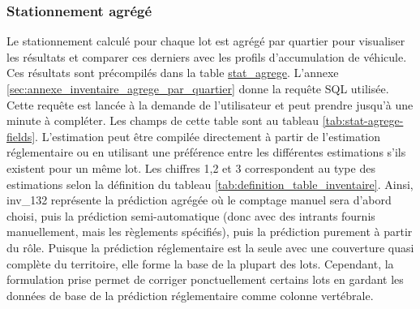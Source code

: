         \subsubsection{Stationnement agrégé}
            Le stationnement calculé pour chaque lot est agrégé par quartier pour visualiser les résultats et comparer ces derniers avec les profils d'accumulation de véhicule. Ces résultats sont précompilés dans la table \ul{stat\_agrege}. L'annexe \ref{sec:annexe_inventaire_agrege_par_quartier} donne la requête SQL utilisée. Cette requête est lancée à la demande de l'utilisateur et peut prendre jusqu'à une minute à compléter. Les champs de cette table sont au tableau \ref{tab:stat-agrege-fields}. L'estimation peut être compilée directement à partir de l'estimation réglementaire ou en utilisant une préférence entre les différentes estimations s'ils existent pour un même lot. Les chiffres 1,2 et 3 correspondent au type des estimations selon la définition du tableau \ref{tab:definition_table_inventaire}. Ainsi, inv\_132 représente la prédiction agrégée où le comptage manuel sera d'abord choisi, puis la prédiction semi-automatique (donc avec des intrants fournis manuellement, mais les règlements spécifiés), puis la prédiction purement à partir du rôle. Puisque la prédiction réglementaire est la seule avec une couverture quasi complète du territoire, elle forme la base de la plupart des lots. Cependant, la formulation prise permet de corriger ponctuellement certains lots en gardant les données de base de la prédiction réglementaire comme colonne vertébrale.

